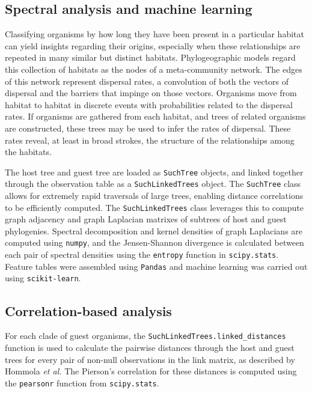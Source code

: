 

\subsection{Spectral analysis and machine learning}

Classifying organisms by how long they have been present in a particular habitat can yield insights regarding their origins, especially when these relationships are repeated in many similar but distinct habitats. Phylogeographic models regard this collection of habitats as the nodes of a meta-community network. The edges of this network represent dispersal rates, a convolution of both the vectors of dispersal and the barriers that impinge on those vectors. Organisms move from habitat to habitat in discrete events with probabilities related to the dispersal rates. If organisms are gathered from each habitat, and trees of related organisms are constructed, these trees may be used to infer the rates of dispersal. These rates reveal, at least in broad strokes, the structure of the relationships among the habitats.

The host tree and guest tree are loaded as {\tt SuchTree} objects, and linked together through the observation table as a {\tt SuchLinkedTrees} object. The {\tt SuchTree} class allows for extremely rapid traversals of large trees, enabling distance correlations to be efficiently computed. The {\tt SuchLinkedTrees} class leverages this to compute graph adjacency and graph Laplacian matrixes of subtrees of host and guest phylogenies. Spectral decomposition and kernel densities of graph Laplacians are computed using {\tt numpy}, and the Jensen-Shannon divergence is calculated between each pair of spectral densities using the {\tt entropy} function in {\tt scipy.stats}. \cite{walt2011numpy} Feature tables were assembled using {\tt Pandas} \cite{mckinney2010data} and machine learning was carried out using {\tt scikit-learn}. \cite{pedregosa2011scikit}

\subsection{Correlation-based analysis}

For each clade of guest organisms, the {\tt SuchLinkedTrees.linked\_distances} function is used to calculate the pairwise distances through the host and guest trees for every pair of non-null observations in the link matrix, as described by Hommola {\em et al.} \cite{hommola2009permutation} The Pierson's correlation for these distances is computed using the {\tt pearsonr} function from {\tt scipy.stats}. \cite{walt2011numpy}

